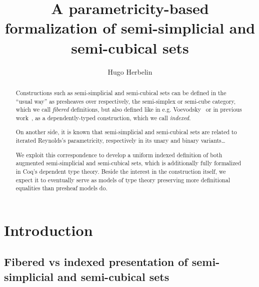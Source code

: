 \documentclass{msc}
\begin{document}
\title{A parametricity-based formalization of semi-simplicial and semi-cubical sets}
\begin{authgrp}
  \author{Hugo Herbelin}
\end{authgrp}
\begin{abstract}
  Constructions such as semi-simplicial and semi-cubical sets can be defined in the ``usual way'' as presheaves over respectively, the semi-simplex or semi-cube category, which we call \emph{fibered} definitions, but also defined like in e.g. Voevodsky~\cite{voevodsky12} or in previous work~\cite{herbelin15}, as a dependently-typed construction, which we call \emph{indexed}.

  On another side, it is known that semi-simplicial and semi-cubical sets are related to iterated Reynolds's parametricity, respectively in its unary and binary variants\dots

  We exploit this correspondence to develop a uniform indexed definition of both augmented semi-simplicial and semi-cubical sets, which is additionally fully formalized in Coq's dependent type theory. Beside the interest in the construction itself, we expect it to eventually serve as models of type theory preserving more definitional equalities than presheaf models do.
\end{abstract}

\section{Introduction}

\subsection{Fibered vs indexed presentation of semi-simplicial and semi-cubical sets}
\end{document}
